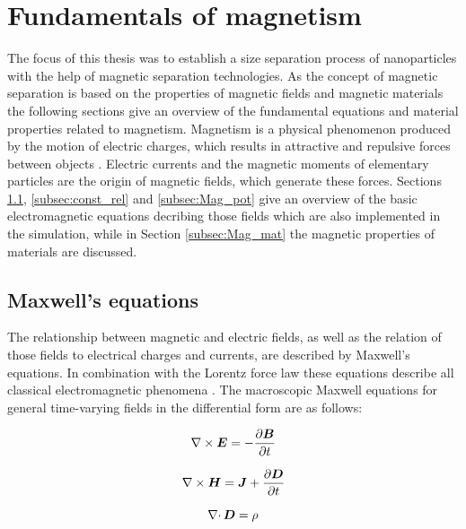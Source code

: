 \section{Fundamentals of magnetism}
\label{sec:Fund_mag}
The focus of this thesis was to establish a size separation process of nanoparticles with the help of magnetic separation technologies. As the concept of magnetic separation is based on the properties of magnetic fields and magnetic materials the following sections give an overview of the fundamental equations and material properties related to magnetism. Magnetism is a physical phenomenon produced by the motion of electric charges, which results in attractive and repulsive forces between objects \cite{stevenson2010oxford}. Electric currents and the magnetic moments of elementary particles are the origin of magnetic fields, which generate these forces. Sections \ref{subsec:Maxwell}, \ref{subsec:const_rel} and \ref{subsec:Mag_pot} give an overview of the basic electromagnetic equations decribing those fields which are also implemented in the simulation, while in Section \ref{subsec:Mag_mat} the magnetic properties of materials are discussed.

\subsection{Maxwell's equations}
\label{subsec:Maxwell}
The relationship between magnetic and electric fields, as well as the relation of those fields to electrical charges and currents, are described by  Maxwell’s equations. In combination with the Lorentz force law these equations describe all classical electromagnetic phenomena \cite{meschede2015gerthsen}. The macroscopic Maxwell equations for general time-varying fields in the differential form are as follows: 

\begin{equation}
\label{eq:Faraday}
\centering
\nabla\times\boldsymbol{E} = -\frac{\partial\boldsymbol{B}}{\partial t}
\end{equation}

\begin{equation}
\label{eq:Ampere}
\centering
\nabla\times\boldsymbol{H} = \boldsymbol{J} + \frac{\partial\boldsymbol{D}}{\partial t}
\end{equation}

\begin{equation}
\label{eq:Gauss_elec}
\centering
\nabla\cdotp\boldsymbol{D} = \rho 
\end{equation}

